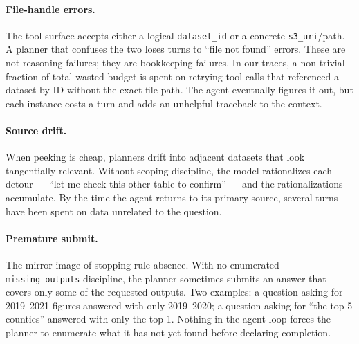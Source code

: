 \paragraph{File-handle errors.} The tool surface accepts either a logical \texttt{dataset\_id} or a concrete \texttt{s3\_uri}/path. A planner that confuses the two loses turns to ``file not found'' errors. These are not reasoning failures; they are bookkeeping failures. In our traces, a non-trivial fraction of total wasted budget is spent on retrying tool calls that referenced a dataset by ID without the exact file path. The agent eventually figures it out, but each instance costs a turn and adds an unhelpful traceback to the context.

\paragraph{Source drift.} When peeking is cheap, planners drift into adjacent datasets that look tangentially relevant. Without scoping discipline, the model rationalizes each detour --- ``let me check this other table to confirm'' --- and the rationalizations accumulate. By the time the agent returns to its primary source, several turns have been spent on data unrelated to the question.

\paragraph{Premature submit.} The mirror image of stopping-rule absence. With no enumerated \texttt{missing\_outputs} discipline, the planner sometimes submits an answer that covers only some of the requested outputs. Two examples: a question asking for 2019--2021 figures answered with only 2019--2020; a question asking for ``the top 5 counties'' answered with only the top 1. Nothing in the agent loop forces the planner to enumerate what it has not yet found before declaring completion.

